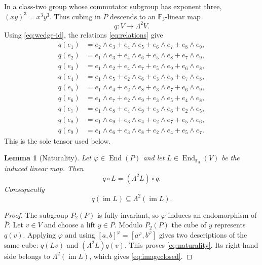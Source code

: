 \documentclass[11pt]{amsart}
\newtheorem{lemma}[theorem]{Lemma}
\theoremstyle{definition}
\theoremstyle{remark}
\newcommand{\F}{\mathbb F}
\newcommand{\End}{\operatorname{End}}
\newcommand{\im}{\operatorname{im}}
\begin{document}
In a class-two group whose commutator subgroup has exponent three,
$(xy)^3=x^3y^3$.  Thus cubing in $\overline P$ descends to an
$\F_3$-linear map
\begin{equation}\label{eq:q}
                         q:V\longrightarrow\Lambda^2V.
\end{equation}
Using \eqref{eq:wedge-id}, the relations \eqref{eq:relations} give
\begin{align*}
q(e_1)&=e_2\wedge e_3+e_4\wedge e_5+e_6\wedge e_7+e_8\wedge e_9,\\
q(e_2)&=e_1\wedge e_3+e_4\wedge e_6+e_5\wedge e_8+e_7\wedge e_9,\\
q(e_3)&=e_1\wedge e_2+e_4\wedge e_7+e_5\wedge e_9+e_6\wedge e_8,\\
q(e_4)&=e_1\wedge e_5+e_2\wedge e_6+e_3\wedge e_9+e_7\wedge e_8,\\
q(e_5)&=e_1\wedge e_4+e_2\wedge e_8+e_3\wedge e_7+e_6\wedge e_9,\\
q(e_6)&=e_1\wedge e_7+e_2\wedge e_9+e_3\wedge e_5+e_4\wedge e_8,\\
q(e_7)&=e_1\wedge e_8+e_4\wedge e_9+e_3\wedge e_6+e_2\wedge e_5,\\
q(e_8)&=e_1\wedge e_9+e_3\wedge e_4+e_2\wedge e_7+e_5\wedge e_6,\\
q(e_9)&=e_1\wedge e_6+e_3\wedge e_8+e_2\wedge e_4+e_5\wedge e_7.
\end{align*}
This is the sole tensor used below.

\begin{lemma}[Naturality]\label{lem:naturality}
Let $\varphi\in\End(P)$ and let $L\in\End_{\F_3}(V)$ be the induced
linear map.  Then
\begin{equation}\label{eq:naturality}
                   q\circ L=(\Lambda^2L)\circ q.
\end{equation}
Consequently
\begin{equation}\label{eq:imageclosed}
                   q(\im L)\subseteq\Lambda^2(\im L).
\end{equation}
\end{lemma}

\begin{proof}
The subgroup $P_2(P)$ is fully invariant, so $\varphi$ induces an
endomorphism of $\overline P$.  Let $v\in V$ and choose a lift $y\in P$.
Modulo $P_2(P)$ the cube of $y$ represents $q(v)$.  Applying $\varphi$
and using $[a,b]^\varphi=[a^\varphi,b^\varphi]$ gives two descriptions
of the same cube: $q(Lv)$ and $(\Lambda^2L)q(v)$.  This proves
\eqref{eq:naturality}.  Its right-hand side belongs to
$\Lambda^2(\im L)$, which gives \eqref{eq:imageclosed}.
\end{proof}
\end{document}
